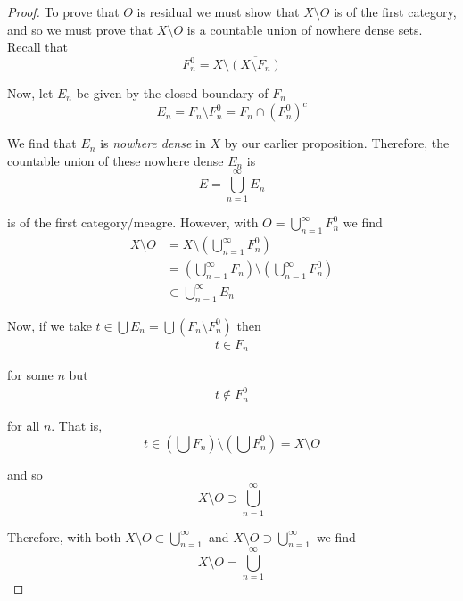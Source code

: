 \documentclass[12pt]{article}
\newlength\tindent
\renewcommand{\indent}{\hspace*{\tindent}}
\begin{document}
\begin{proof} To prove that $O$ is residual we must show that $X\setminus O$ is of the first category, and so we must prove that $X\setminus O$ is a countable union of nowhere dense sets. Recall that
\begin{equation*}
	F^0_n = X \setminus \overline{\left(X\setminus F_n\right)}
\end{equation*}

Now, let $E_n$ be given by the closed boundary of $F_n$
\begin{equation*}
	E_n = F_n \setminus F^0_n = F_n \cap \left(F^0_n\right)^c
\end{equation*}

\indent We find that $E_n$ is {\em nowhere dense} in $X$ by our earlier proposition. Therefore, the countable union of these nowhere dense $E_n$ is
\begin{equation*}
	E = \bigcup^\infty_{n = 1} E_n
\end{equation*}

is of the first category/meagre. However, with $O = \bigcup^\infty_{n = 1} F^0_n$ we find
\begin{align*}
	X\setminus O &= X \setminus \left( \bigcup^\infty_{n = 1} F^0_n \right) \\
	&= \left( \bigcup^\infty_{n = 1} F_n \right) \setminus \left( \bigcup^\infty_{n = 1} F^0_n \right) \\
	&\subset \bigcup^\infty_{n = 1} E_n
\end{align*}


Now, if we take $t \in \bigcup E_n = \bigcup \left( F_n \setminus F^0_n \right)$ then
\begin{align*}
	t \in F_n
\end{align*}

for some $n$ but
\begin{align*}
	t \notin F^0_n
\end{align*}

for all $n$. That is,
\begin{equation*}
	t \in \left( \bigcup F_n \right) \setminus \left( \bigcup F^0_n \right) = X\setminus O
\end{equation*}

and so
\begin{equation*}
	X\setminus O \supset \bigcup^\infty_{n = 1}
\end{equation*}

Therefore, with both $X\setminus O \subset \bigcup^\infty_{n = 1}$ and $X\setminus O \supset \bigcup^\infty_{n = 1}$ we find
\begin{equation*}
	X\setminus O = \bigcup^\infty_{n = 1}
\end{equation*}


\end{proof}
\end{document}
